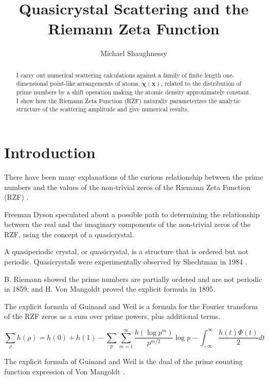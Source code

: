 \documentclass[11pt, oneside]{article}
\title{Quasicrystal Scattering and the Riemann Zeta Function}
\author{Michael Shaughnessy}
\begin{document}
\maketitle

\begin{abstract}
I carry out numerical scattering calculations against a family of finite length one-dimensional point-like arrangements of atoms, $\mathbf{\chi(x)}$, related to the distribution of prime numbers by a shift operation making the atomic density approximately constant. 
I show how the Riemann Zeta Function (RZF) naturally parameterizes the analytic structure of the scattering amplitude and give numerical results.
\end{abstract}

\section{Introduction}

There have been many explanations of the curious relationship between the prime numbers and the values of the non-trivial zeros of the Riemann Zeta Function (RZF) \cite{Riemann1859, Selberg1956, Dyson2009, Zhang2014}.

Freeman Dyson \cite{Baez2013} speculated about a possible path to determining the relationship between the real and the imaginary components of the non-trivial zeros of the RZF, using the concept of a quasicrystal.

A quasiperiodic crystal, or quasicrystal, is a structure that is ordered but not periodic. Quasicrystals were experimentally observed by Shechtman in 1984 \cite{Shectman1984}. 

B. Riemann showed the prime numbers are partially ordered and are not periodic \cite{Riemann1859} in 1859, and H. Von Mangoldt \cite{VonMangoldt1895} proved the explicit formula in 1895.

The explicit formula of Guinand and Weil \cite{Weil} is a formula for the Fourier transform of the RZF zeros as a sum over prime powers, plus additional terms.  

\begin{equation}
\sum_{\rho} h(\rho) = h(0) + h(1) - \sum_{p} \sum_{m=1}^{\infty} \frac{h(\log p^m)}{p^{m/2}} \log p - \int_{-\infty}^{\infty} \frac{h(t) \Phi(t)}{2} dt
\end{equation}

The explicit formula of Guinand and Weil is the dual of the prime counting function expression of Von Mangoldt \cite{VonMangoldt1895}.
\end{document}
